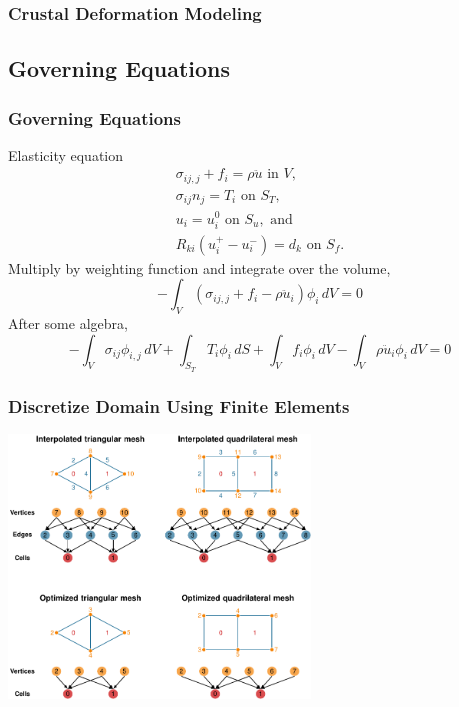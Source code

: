 \documentclass[aspectratio=169]{beamer}
\begin{document}
\begin{frame}
  \frametitle{Crustal Deformation Modeling}

  
\end{frame}


\subsection{Governing Equations}

\begin{frame}
  \frametitle{Governing Equations}
  \summary{}

  \vfill
  Elasticity equation
  \begin{gather}
    \sigma_{ij,j} + f_i = \rho \ddot{u} \text{ in } V, \\
    \sigma_{ij} n_j = T_i \text{ on } S_T, \\
    u_i = u_i^0 \text{ on } S_u, \text{ and } \\
    R_{ki}(u^{+}_i - u^{-}_i) = d_k \text{ on } S_f.
  \end{gather}
  Multiply by weighting function and integrate over the volume,
  \begin{equation}
    -\int_V (\sigma_{ij,j} + f_i - \rho \ddot{u}_i) \phi_i \, dV = 0
  \end{equation}
  After some algebra,
  \begin{equation}
    -\int_V \sigma_{ij} \phi_{i,j} \, dV 
    + \int_{S_T} T_i \phi_i\, dS
    + \int_V f_i \phi_i \, dV 
    - \int_V \rho \ddot{u}_i \phi_i \, dV = 0
  \end{equation}
  \vfill
  
\end{frame}


\begin{frame}
  \frametitle{Discretize Domain Using Finite Elements}
 
   \begin{center}
     \includegraphics[height=7.0cm]{figs/meshtopology}
   \end{center}
   
 \end{frame}
 
\end{document}
